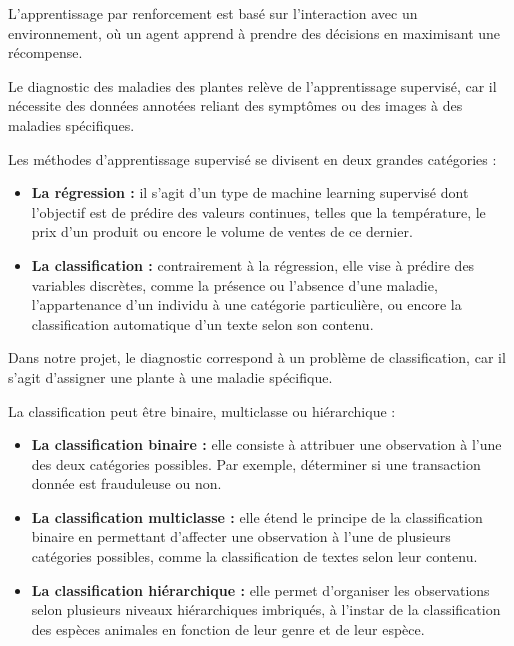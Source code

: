 L'apprentissage par renforcement est basé sur l'interaction avec un environnement, où un agent apprend à prendre des décisions en maximisant une récompense.

Le diagnostic des maladies des plantes relève de l'apprentissage supervisé, car il nécessite des données annotées reliant des symptômes ou des images à des maladies spécifiques.

Les méthodes d'apprentissage supervisé se divisent en deux grandes catégories : 
\begin{itemize}[label=\textbullet, leftmargin=*, itemsep=0.5em]
    \item \textbf{La régression :} il s'agit d'un type de machine learning supervisé 
    dont l'objectif est de prédire des valeurs continues, telles que la température, 
    le prix d'un produit ou encore le volume de ventes de ce dernier.
    
    \item \textbf{La classification :} contrairement à la régression, elle vise à 
    prédire des variables discrètes, comme la présence ou l'absence d'une maladie, 
    l'appartenance d'un individu à une catégorie particulière, ou encore la 
    classification automatique d'un texte selon son contenu.
\end{itemize}

Dans notre projet, le diagnostic correspond à un problème de classification, car il s'agit d'assigner une plante à une maladie spécifique.

La classification peut être binaire, multiclasse ou hiérarchique :
\begin{itemize}[label=\textbullet, leftmargin=*, itemsep=0.5em]
    \item \textbf{La classification binaire :} elle consiste à attribuer une observation 
    à l'une des deux catégories possibles. Par exemple, déterminer si une transaction 
    donnée est frauduleuse ou non.

    \item \textbf{La classification multiclasse :} elle étend le principe de la 
    classification binaire en permettant d'affecter une observation à l'une de 
    plusieurs catégories possibles, comme la classification de textes selon leur contenu.

    \item \textbf{La classification hiérarchique :} elle permet d'organiser les 
    observations selon plusieurs niveaux hiérarchiques imbriqués, à l'instar de 
    la classification des espèces animales en fonction de leur genre et de leur espèce.
\end{itemize}

